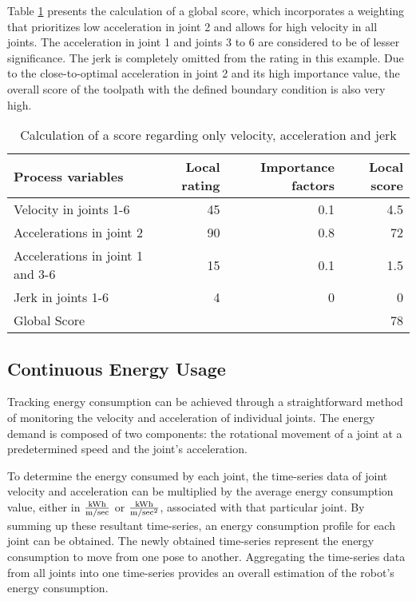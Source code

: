 \documentclass[conference]{IEEEtran}
\begin{document}
Table \ref{VAJ} presents the calculation of a global score, which incorporates a weighting that prioritizes low acceleration in joint 2 and allows for high velocity in all joints. The acceleration in joint 1 and joints 3 to 6 are considered to be of lesser significance. The jerk is completely omitted from the rating in this example. Due to the close-to-optimal acceleration in joint 2 and its high importance value, the overall score of the toolpath with the defined boundary condition is also very high.

\begin{table}[H]
	\centering
	\caption{Calculation of a score regarding only velocity, acceleration and jerk}
	\begin{tabular}{||l|r|r|r||}
		Process variables & Local rating & Importance factors & Local score\\
		\hline
		\hline
		\hline
		Velocity in joints 1-6& 45& 0.1&4.5\\
		Accelerations in joint 2& 90 & 0.8 & 72\\
		Accelerations in joint 1 and 3-6 & 15& 0.1&1.5\\
		Jerk in joints 1-6& 4& 0&0\\
		
		\hline
		\hline
		\hline
		Global Score& & &78\\
		\hline
		\hline
	\end{tabular}
	
	
	\label{VAJ}
\end{table}


\subsection{Continuous Energy Usage}
Tracking energy consumption can be achieved through a straightforward method of monitoring the velocity and acceleration of individual joints. The energy demand is composed of two components: the rotational movement of a joint at a predetermined speed and the joint's acceleration.

To determine the energy consumed by each joint, the time-series data of joint velocity and acceleration can be multiplied by the average energy consumption value, either in \(\frac{\si[per-mode=symbol]{\kWh}}{\si[per-mode=symbol]{\m\per\sec }}\) or \(\frac{\si[per-mode=symbol]{\kWh}}{\si[per-mode=symbol]{\m\per\sec\squared }}\), associated with that particular joint. By summing up these resultant time-series, an energy consumption profile for each joint can be obtained. The newly obtained time-series represent the energy consumption to move from one pose to another. Aggregating the time-series data from all joints into one time-series provides an overall estimation of the robot's energy consumption. 
\end{document}
